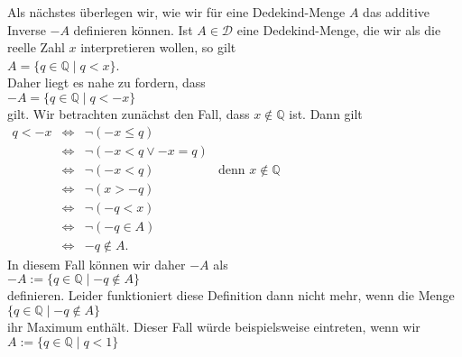Als n\"achstes \"uberlegen wir, wie wir f\"ur eine Dedekind-Menge $A$ das additive Inverse $-\!A$ 
definieren k\"onnen.  Ist $A \in \mathcal{D}$ eine Dedekind-Menge, die wir als die reelle Zahl $x$
interpretieren wollen, so gilt
\\[0.2cm]
\hspace*{1.3cm}
$A = \{ q \in \mathbb{Q} \mid q < x \}$.
\\[0.2cm]
Daher liegt es nahe zu fordern, dass 
\\[0.2cm]
\hspace*{1.3cm}
$-A = \{ q \in \mathbb{Q} \mid q < -x \}$
\\[0.2cm]
gilt.  Wir betrachten zun\"achst den Fall, dass $x \not\in \mathbb{Q}$ ist.
Dann gilt
\\[0.2cm]
\hspace*{1.3cm}
$
\begin{array}{lcll}
q < -x & \Leftrightarrow & \neg (-x \leq q)                                              \\
       & \Leftrightarrow & \neg (-x < q \vee -x = q)                                     \\
       & \Leftrightarrow & \neg (-x < q)             & \mbox{denn $x \not\in\mathbb{Q}$} \\
       & \Leftrightarrow & \neg (x > -q)                                                 \\
       & \Leftrightarrow & \neg (-q < x)                                                 \\
       & \Leftrightarrow & \neg (-q \in A)                                               \\
       & \Leftrightarrow & -q \not\in A.
\end{array}
$
\\[0.2cm]
In diesem Fall k\"onnen wir daher $-A$ als
\\[0.2cm]
\hspace*{1.3cm}
$-A := \{ q \in \mathbb{Q} \mid -q \not\in A \}$
\\[0.2cm]
definieren.  Leider funktioniert diese Definition dann nicht mehr, wenn die Menge 
\\[0.2cm]
\hspace*{1.3cm}
$\{ q \in \mathbb{Q} \mid -q \not\in A \}$
\\[0.2cm]
ihr Maximum enth\"alt.  Dieser Fall w\"urde beispielsweise eintreten, wenn wir
\\[0.2cm]
\hspace*{1.3cm}
$A := \{ q \in \mathbb{Q} \mid q < 1 \}$
